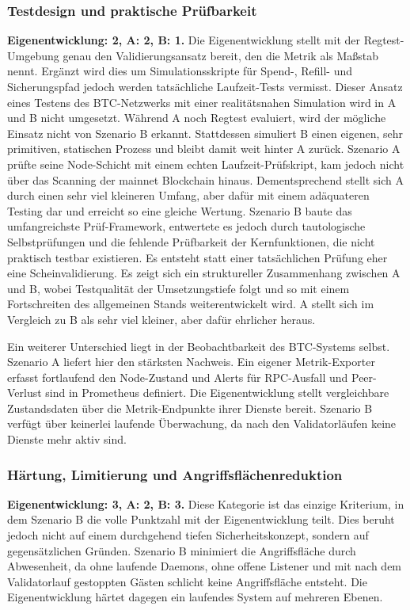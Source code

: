 {\subsubsection{Testdesign und praktische Prüfbarkeit}
\textbf{Eigenentwicklung: 2, A: 2, B: 1.} Die Eigenentwicklung stellt mit der Regtest-Umgebung genau den Validierungsansatz bereit, den die Metrik als Maßstab nennt. Ergänzt wird dies um Simulationsskripte für Spend-, Refill- und Sicherungspfad jedoch werden tatsächliche Laufzeit-Tests vermisst. Dieser Ansatz eines Testens des \ac{BTC}-Netzwerks mit einer realitätsnahen Simulation wird in A und B nicht umgesetzt. Während A noch Regtest evaluiert, wird der mögliche Einsatz nicht von Szenario B erkannt. Stattdessen simuliert B einen eigenen, sehr primitiven, statischen Prozess und bleibt damit weit hinter A zurück. 
Szenario A prüfte seine Node-Schicht mit einem echten Laufzeit-Prüfskript, kam jedoch nicht über das Scanning der mainnet Blockchain hinaus. Dementsprechend stellt sich A durch einen sehr viel kleineren Umfang, aber dafür mit einem adäquateren Testing dar und erreicht so eine gleiche Wertung.
Szenario B baute das umfangreichste Prüf-Framework, entwertete es jedoch durch tautologische Selbstprüfungen und die fehlende Prüfbarkeit der Kernfunktionen, die nicht praktisch testbar existieren. Es entsteht statt einer tatsächlichen Prüfung eher eine Scheinvalidierung.
Es zeigt sich ein struktureller Zusammenhang zwischen A und B, wobei Testqualität der Umsetzungstiefe folgt und so mit einem Fortschreiten des allgemeinen Stands weiterentwickelt wird.
A stellt sich im Vergleich zu B als sehr viel kleiner, aber dafür ehrlicher heraus.

Ein weiterer Unterschied liegt in der Beobachtbarkeit des \ac{BTC}-Systems selbst. 
Szenario A liefert hier den stärksten Nachweis. Ein eigener Metrik-Exporter erfasst fortlaufend den Node-Zustand und Alerts für \ac{RPC}-Ausfall und Peer-Verlust sind in Prometheus definiert. Die Eigenentwicklung stellt vergleichbare Zustandsdaten über die Metrik-Endpunkte
ihrer Dienste bereit. 
Szenario B verfügt über keinerlei laufende Überwachung, da nach den Validatorläufen keine Dienste mehr aktiv sind.

\subsubsection{Härtung, Limitierung und Angriffsflächenreduktion}
\textbf{Eigenentwicklung: 3, A: 2, B: 3.} Diese Kategorie ist das einzige Kriterium, in dem Szenario B die volle Punktzahl mit der Eigenentwicklung teilt. Dies beruht jedoch nicht auf einem durchgehend tiefen Sicherheitskonzept, sondern auf gegensätzlichen Gründen. Szenario B minimiert die Angriffsfläche durch Abwesenheit, da ohne laufende Daemons, ohne offene Listener und mit nach dem Validatorlauf gestoppten Gästen schlicht keine Angriffsfläche entsteht.
Die Eigenentwicklung härtet dagegen ein laufendes System auf mehreren Ebenen.

}
